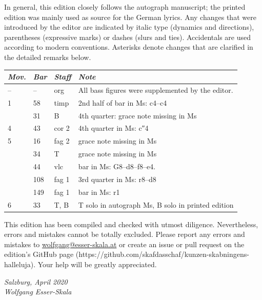 \documentclass[parskip=full]{scrreprt}
\begin{document}
In general, this edition closely follows the autograph manuscript; the printed edition was mainly used as source for the German lyrics. Any changes that were introduced by the editor are indicated by italic type (dynamics and directions), parentheses (expressive marks) or dashes (slurs and ties). Accidentals are used according to modern conventions. Asterisks denote changes that are clarified in the detailed remarks below.

\bigskip


\begin{longtable}{lll L{10cm}}
	\toprule
	\itshape Mov. & \itshape Bar & \itshape Staff & \itshape Note \\
	\midrule \endhead
	–  & –   & org   & All bass figures were supplemented by the editor. \\
	1  & 58  & timp  & 2nd half of bar in Ms: c4–c4 \\
	   & 31  & B     & 4th quarter: grace note missing in Ms \\
	4  & 43  & cor 2 & 4th quarter in Ms: c″4 \\
	5  & 16  & fag 2 & grace note missing in Ms \\
	   & 34  & T     & grace note missing in Ms \\
	   & 44  & vlc   & bar in Ms: G8–d8–f8–e4. \\
	   & 108 & fag 1 & 3rd quarter in Ms: r8–d8 \\
	   & 149 & fag 1 & bar in Ms: r1 \\
	6  & 33  & T, B  & T solo in autograph Ms, B solo in printed edition \\
	\bottomrule
\end{longtable}


This edition has been compiled and checked with utmost diligence. Nevertheless, errors and mistakes cannot be totally excluded. Please report any errors and mistakes to \url{wolfgang@esser-skala.at} or create an issue or pull request on the edition’s GitHub page (https://github.com/skafdasschaf/kunzen-skabningens-halleluja). Your help will be greatly appreciated.

\bigskip
\textit{Salzburg, April 2020\\
Wolfgang Esser-Skala}
\end{document}
